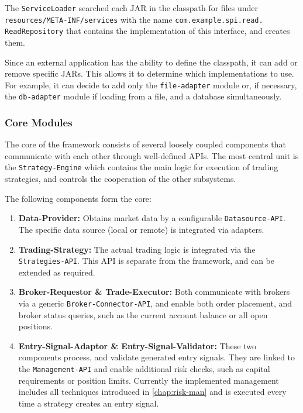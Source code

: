 The \texttt{ServiceLoader} searched each JAR in the classpath for files under \\\texttt{resources/META-INF/services} with the name \texttt{com.example.spi.read.}\\\texttt{ReadRepository} that contains the implementation of this interface, and creates them.

Since an external application has the ability to define the classpath, it can add or remove specific JARs.
This allows it to determine which implementations to use.
For example, it can decide to add only the \texttt{file-adapter} module or, if necessary, the \texttt{db-adapter} module if loading from a file, and a database simultaneously.

\subsubsection{Core Modules}

The core of the framework consists of several loosely coupled components that communicate with each other through well-defined APIs.
The most central unit is the \texttt{Strategy-Engine} which contains the main logic for execution of trading strategies, and controls the cooperation of the other subsystems.

The following components form the core:

\begin{enumerate}
    \item \textbf{Data-Provider:} Obtains market data by a configurable \texttt{Datasource-API}.
    The specific data source (local or remote) is integrated via adapters.
    \item \textbf{Trading-Strategy:} The actual trading logic is integrated via the \texttt{Strategies-API}.
    This API is separate from the framework, and can be extended as required.
    \item \textbf{Broker-Requestor \& Trade-Executor:} Both communicate with brokers via a generic \texttt{Broker-Connector-API}, and enable both order placement, and broker status queries, such as the current account balance or all open positions.
    \newpage
    \item \textbf{Entry-Signal-Adaptor \& Entry-Signal-Validator:} These two components process, and validate generated entry signals.
    They are linked to the \texttt{Management-API} and enable additional risk checks, such as capital requirements or position limits.
    Currently the implemented management includes all techniques introduced in \autoref{chap:risk-man} and is executed every time a strategy creates an entry signal.
\end{enumerate}

